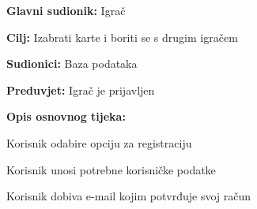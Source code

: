 					\noindent {}
					\begin{packed_item}
	
						\item \textbf{Glavni sudionik: }Igrač
						\item  \textbf{Cilj:} Izabrati karte i boriti se s drugim igračem
						\item  \textbf{Sudionici:} Baza podataka
						\item  \textbf{Preduvjet:} Igrač je prijavljen
						\item  \textbf{Opis osnovnog tijeka:}
						
						\item[] \begin{packed_enum}
	
							\item Korisnik odabire opciju za registraciju
							\item Korisnik unosi potrebne korisničke podatke
							\item Korisnik dobiva e-mail kojim potvrđuje svoj račun

						\end{packed_enum}
						
					\end{packed_item}
					
